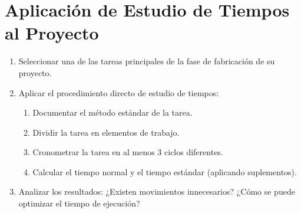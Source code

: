 \documentclass[../main]{subfiles}
\begin{document}
\chapter{Aplicación de Estudio de Tiempos al Proyecto}

\begin{enumerate}
  \item Seleccionar una de las tareas principales de la fase de fabricación de su proyecto.
  \item Aplicar el procedimiento directo de estudio de tiempos:
    \begin{enumerate}
      \item Documentar el método estándar de la tarea.
      \item Dividir la tarea en elementos de trabajo.
      \item Cronometrar la tarea en al menos 3 ciclos diferentes.
      \item Calcular el tiempo normal y el tiempo estándar (aplicando suplementos).
    \end{enumerate}
  \item Analizar los resultados: ¿Existen movimientos innecesarios? ¿Cómo se puede optimizar el tiempo de ejecución?
\end{enumerate}
\end{document}
